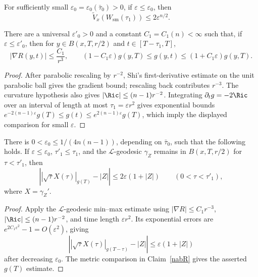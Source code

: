 \begin{corollary}
\label{cor:reduced-volume-small-bound}
For sufficiently small
$\varepsilon_0=\varepsilon_0(\bar\tau_0)>0$, if
$\varepsilon\leq\varepsilon_0$, then
\[
  \widetilde V_x(W_{\mathrm{sm}}(\tau_1))\leq2\varepsilon^{n/2}.
\]
\end{corollary}

\begin{claim}
\label{claim:scalar-curvature-gradient-metric-bound}
\label{nabR}
There are a universal $\varepsilon'_0>0$ and a constant
$C_1=C_1(n)<\infty$ such that, if
$\varepsilon\leq\varepsilon'_0$, then for
$y\in B(x,T,r/2)$ and $t\in[T-\tau_1,T]$,
\[
  |\nabla R(y,t)|\leq\frac{C_1}{r^3},
  \qquad
  (1-C_1\varepsilon)g(y,T)
  \leq g(y,t)\leq
  (1+C_1\varepsilon)g(y,T).
\]
\end{claim}

\begin{proof}
\sketch
{}
After parabolic rescaling by $r^{-2}$, Shi's first-derivative estimate on the
unit parabolic ball gives the gradient bound; rescaling back contributes
$r^{-3}$. The curvature hypothesis also gives
$|\Ric|\leq(n-1)r^{-2}$. Integrating
$\partial_tg=-2\Ric$ over an interval of length at most
$\tau_1=\varepsilon r^2$ gives exponential bounds
$e^{-2(n-1)\varepsilon}g(T)\leq g(t)\leq
e^{2(n-1)\varepsilon}g(T)$, which imply the displayed comparison for small
$\varepsilon$.
\end{proof}

\begin{claim}
\label{claim:l-geodesic-norm-comparison}
There is
$0<\varepsilon_0\leq1/(4n(n-1))$, depending on $\bar\tau_0$, such that the
following holds. If $\varepsilon\leq\varepsilon_0$,
$\tau'_1\leq\tau_1$, and the $\mathcal L$-geodesic $\gamma_Z$ remains in
$B(x,T,r/2)$ for $\tau<\tau'_1$, then
\[
  \left||\sqrt\tau X(\tau)|_{g(T)}-|Z|\right|
  \leq2\varepsilon(1+|Z|)
  \qquad(0<\tau<\tau'_1),
\]
where $X=\gamma_Z'$.
\end{claim}

\begin{proof}
\sketch
{}
Apply the $\mathcal L$-geodesic min--max estimate using
$|\nabla R|\leq C_1r^{-3}$, $|\Ric|\leq(n-1)r^{-2}$, and time length
$\varepsilon r^2$. Its exponential errors are
$e^{2C_1\varepsilon^2}-1=O(\varepsilon^2)$, giving
\[
  \left||\sqrt\tau X(\tau)|_{g(T-\tau)}-|Z|\right|
  \leq\varepsilon(1+|Z|)
\]
after decreasing $\varepsilon_0$. The metric comparison in Claim~\ref{nabR}
gives the asserted $g(T)$ estimate.
\end{proof}

